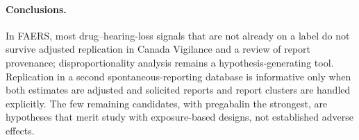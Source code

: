 \paragraph{Conclusions.} In FAERS, most drug--hearing-loss signals that are not already on a label do not survive adjusted
replication in Canada Vigilance and a review of report provenance; disproportionality analysis remains a
hypothesis-generating tool. Replication in a second spontaneous-reporting database is informative only when both estimates are
adjusted and solicited reports and report clusters are handled explicitly. The few remaining candidates, with pregabalin the
strongest, are hypotheses that merit study with exposure-based designs, not established adverse effects.
